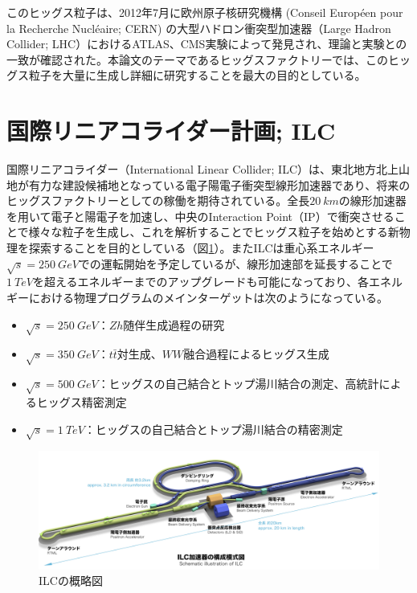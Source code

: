 このヒッグス粒子は、2012年7月に欧州原子核研究機構 (Conseil Europ\'een pour la Recherche Nucl\'eaire; CERN) の大型ハドロン衝突型加速器（Large Hadron Collider; LHC）におけるATLAS、CMS実験によって発見され、理論と実験との一致が確認された。本論文のテーマであるヒッグスファクトリーでは、このヒッグス粒子を大量に生成し詳細に研究することを最大の目的としている。\\

\section{国際リニアコライダー計画; ILC}
国際リニアコライダー（International Linear Collider; ILC）は、東北地方北上山地が有力な建設候補地となっている電子陽電子衝突型線形加速器であり、将来のヒッグスファクトリーとしての稼働を期待されている。全長$\SI{20}{km}$の線形加速器を用いて電子と陽電子を加速し、中央のInteraction Point（IP）で衝突させることで様々な粒子を生成し、これを解析することでヒッグス粒子を始めとする新物理を探索することを目的としている（図\ref{ilc}）。またILCは重心系エネルギー$\sqrt{s} = \SI{250}{GeV}$での運転開始を予定しているが、線形加速部を延長することで$\SI{1}{TeV}$を超えるエネルギーまでのアップグレードも可能になっており、各エネルギーにおける物理プログラムのメインターゲットは次のようになっている。
\begin{itemize}
\item $\sqrt{s} = \SI{250}{GeV}$：$Zh$随伴生成過程の研究
\item $\sqrt{s} = \SI{350}{GeV}$：$t\bar{t}$対生成、$WW$融合過程によるヒッグス生成
\item $\sqrt{s} = \SI{500}{GeV}$：ヒッグスの自己結合とトップ湯川結合の測定、高統計によるヒッグス精密測定
\item $\sqrt{s} = \SI{1}{TeV}$：ヒッグスの自己結合とトップ湯川結合の精密測定
\end{itemize}
\begin{figure}[t]
	\begin{center}
 \includegraphics[keepaspectratio, scale=0.25]
 	{Figure/Introduction/ilc.png}
 		\caption{ILCの概略図}
 		\label{ilc}
	\end{center}
\end{figure}

